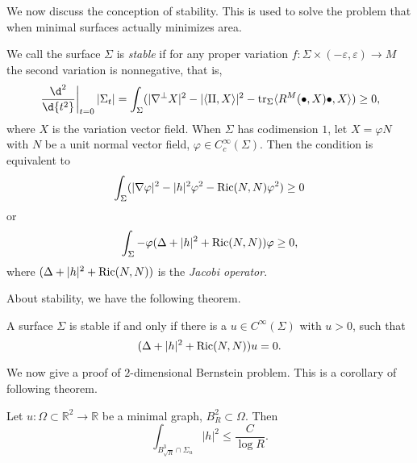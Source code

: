 We now discuss the conception of stability.
This is used to solve the problem that when minimal surfaces actually minimizes area.
\begin{defn}[Stability]
    We call the surface $\Sigma$ is \emph{stable} if for any proper variation $f:\Sigma\times(-\varepsilon,\varepsilon)\to M$ the second variation is nonnegative, that is,
    \[\left.\frac{\d^2{}}{\d{t^2}}\right|_{t=0}|\Sigma_t|=\int_\Sigma(|\nabla^\perp X|^2-|\langle\II,X\rangle|^2-\tr_\Sigma\langle R^M(\bullet,X)\bullet,X\rangle)\geq 0,\]
    where $X$ is the variation vector field.
    When $\Sigma$ has codimension $1$, let $X=\varphi N$ with $N$ be a unit normal vector field, $\varphi\in C^\infty_c(\Sigma)$.
    Then the condition is equivalent to
    \[\int_\Sigma(|\nabla\varphi|^2-|h|^2\varphi^2-\operatorname{Ric}(N,N)\varphi^2)\geq 0\]
    or
    \[\int_\Sigma-\varphi(\Delta+|h|^2+\operatorname{Ric}(N,N))\varphi\geq 0,\]
    where $(\Delta+|h|^2+\operatorname{Ric}(N,N))$ is the \emph{Jacobi operator}.
\end{defn}

About stability, we have the following theorem.
\begin{thm}
    A surface $\Sigma$ is stable if and only if there is a $u\in C^\infty(\Sigma)$ with $u>0$, such that
    \[(\Delta+|h|^2+\operatorname{Ric}(N,N))u=0.\]
\end{thm}

We now give a proof of $2$-dimensional Bernstein problem.
This is a corollary of following theorem.
\begin{thm}\label{prebernstein}
    Let $u:\Omega\subset\mathbb{R}^2\to\mathbb{R}$ be a minimal graph, $B^2_R\subset\Omega$.
    Then
    \[\int_{B^3_{\sqrt{R}}\cap\Sigma_u}|h|^2\leq\frac{C}{\log{R}}.\]
\end{thm}

